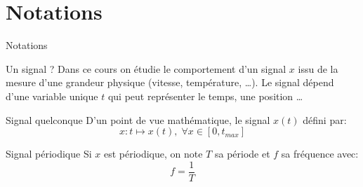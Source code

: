 \documentclass[8pt,a4paper]{beamer}
\begin{document}
\section{Notations}
\begin{frame}{Notations}
\begin{block}{Un signal ?}
Dans ce cours on étudie le comportement d'un signal $x$ issu de la mesure d'une grandeur physique (vitesse, température, \ldots). Le signal dépend d'une variable unique $t$ qui peut représenter le temps, une position \ldots 
\end{block}

\begin{block}{Signal quelconque}
D'un point de vue mathématique, le signal $x(t)$ défini par:
$$
x:t \longmapsto x(t), \; \forall x \in [0,t_{max}]
$$

\end{block}

\begin{block}{Signal périodique}
Si $x$ est périodique, on note $T$ sa période et $f$ sa fréquence avec:
$$
f = \frac{1}{T}
$$
\end{block}
\end{frame}
\end{document}
